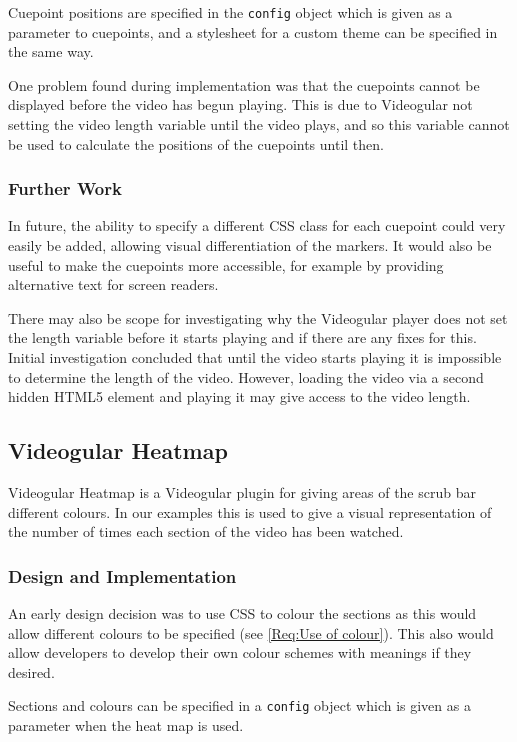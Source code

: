 Cuepoint positions are specified in the \texttt{config} object which is given as a parameter to cuepoints, and a stylesheet for a custom theme can be specified in the same way.

One problem found during implementation was that the cuepoints cannot be displayed before the video has begun playing. This is due to \gls{Videogular} not setting the video length variable until the video plays, and so this variable cannot be used to calculate the positions of the cuepoints until then.

\subsubsection{Further Work}
In future, the ability to specify a different \gls{CSS} class for each cuepoint could very easily be added, allowing visual differentiation of the markers. It would also be useful to make the cuepoints more accessible, for example by providing alternative text for screen readers.

There may also be scope for investigating why the \gls{Videogular} player does not set the length variable before it starts playing and if there are any fixes for this. Initial investigation concluded that until the video starts playing it is impossible to determine the length of the video. However, loading the video via a second hidden \gls{HTML5} element and playing it may give access to the video length.

\subsection{Videogular Heatmap}
\gls{Videogular} Heatmap is a \gls{Videogular} plugin for giving areas of the scrub bar different colours. In our examples this is used to give a visual representation of the number of times each section of the video has been watched.

\subsubsection{Design and Implementation}
An early design decision was to use \gls{CSS} to colour the sections as this would allow different colours to be specified (see \cref{Req:Use of colour}). This also would allow developers to develop their own colour schemes with meanings if they desired.

Sections and colours can be specified in a \texttt{config} object which is given as a parameter when the heat map is used.

